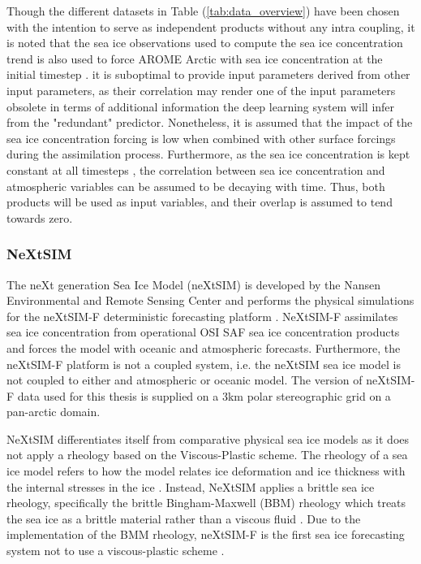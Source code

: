\documentclass[../main/thesis.tex]{subfiles}
\begin{document}
Though the different datasets in Table (\ref{tab:data_overview}) have been chosen with the intention to serve as independent products without any intra coupling, it is noted that the sea ice observations used to compute the sea ice concentration trend \citep{Tonboe2017} is also used to force AROME Arctic with sea ice concentration at the initial timestep \citep{Mueller2017}. it is suboptimal to provide input parameters derived from other input parameters, as their correlation may render one of the input parameters obsolete in terms of additional information the deep learning system will infer from the "redundant" predictor. Nonetheless, it is assumed that the impact of the sea ice concentration forcing is low when combined with other surface forcings during the assimilation process. Furthermore, as the sea ice concentration is kept constant at all timesteps \citep{Mueller2017}, the correlation between sea ice concentration and atmospheric variables can be assumed to be decaying with time. Thus, both products will be used as input variables, and their overlap is assumed to tend towards zero.


\subsubsection{NeXtSIM}
\label{sec:nextsim}
The neXt generation Sea Ice Model (neXtSIM) is developed by the Nansen Environmental and Remote Sensing Center and performs the physical simulations for the neXtSIM-F deterministic forecasting platform \citep{Williams2021}. NeXtSIM-F assimilates sea ice concentration from operational OSI SAF sea ice concentration products \citep{Tonboe2017, Lavelle2016} and forces the model with oceanic and atmospheric forecasts. Furthermore, the neXtSIM-F platform is not a coupled system, i.e. the neXtSIM sea ice model is not coupled to either and atmospheric or oceanic model. The version of neXtSIM-F data used for this thesis is supplied on a 3km polar stereographic grid on a pan-arctic domain. 

NeXtSIM differentiates itself from comparative physical sea ice models as it does not apply a rheology based on the Viscous-Plastic scheme. The rheology of a sea ice model refers to how the model relates ice deformation and ice thickness with the internal stresses in the ice \citep{Hibler1979}. Instead, NeXtSIM applies a brittle sea ice rheology, specifically the brittle Bingham-Maxwell (BBM) rheology which treats the sea ice as a brittle material rather than a viscous fluid \citep{Olason2022}. Due to the implementation of the BMM rheology, neXtSIM-F is the first sea ice forecasting system not to use a viscous-plastic scheme \citep{Williams2021}.
\end{document}
